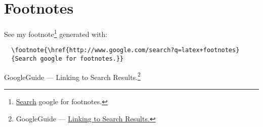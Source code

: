 
\clearpage
\newpage
\section{Footnotes}
See my
footnote\footnote{\href{http://www.google.com/search?q=latex+footnotes}{Search}
google for footnotes.}
generated with:

\begin{verbatim}
  \footnote{\href{http://www.google.com/search?q=latex+footnotes}
  {Search google for footnotes.}}
\end{verbatim}

\noindent GoogleGuide --- Linking to Search
Results.\footnote{GoogleGuide --- \href{http://www.googleguide.com/linking.html}{Linking to Search Results.}}

